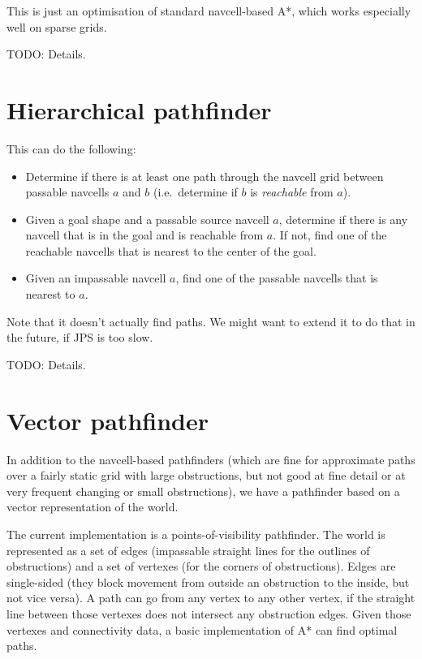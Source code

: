 \documentclass[a4paper,10pt]{article}
\begin{document}
This is just an optimisation of standard navcell-based A*,
which works especially well on sparse grids.

TODO: Details.

\section{Hierarchical pathfinder}

This can do the following:
\begin{itemize}
 \item Determine if there is at least one path through the navcell grid between
 passable navcells $a$ and $b$ (i.e.\ determine if $b$ is \emph{reachable} from $a$).
 \item Given a goal shape and a passable source navcell $a$,
 determine if there is any navcell that is in the goal and is reachable from $a$.
 If not, find one of the reachable navcells that is nearest to the center of the goal.
 \item Given an impassable navcell $a$, find one of the passable navcells that is
 nearest to $a$.
\end{itemize}

Note that it doesn't actually find paths.
We might want to extend it to do that in the future,
if JPS is too slow.

TODO: Details.

\section{Vector pathfinder}

In addition to the navcell-based pathfinders (which are fine for approximate paths
over a fairly static grid with large obstructions,
but not good at fine detail or at very frequent changing or small obstructions),
we have a pathfinder based on a vector representation of the world.

The current implementation is a points-of-visibility pathfinder.
The world is represented as a set of edges (impassable straight lines for the outlines of obstructions)
and a set of vertexes (for the corners of obstructions).
Edges are single-sided (they block movement from outside an obstruction to the inside,
but not vice versa).
A path can go from any vertex to any other vertex, if the straight line between those vertexes
does not intersect any obstruction edges.
Given those vertexes and connectivity data,
a basic implementation of A* can find optimal paths.
\end{document}
